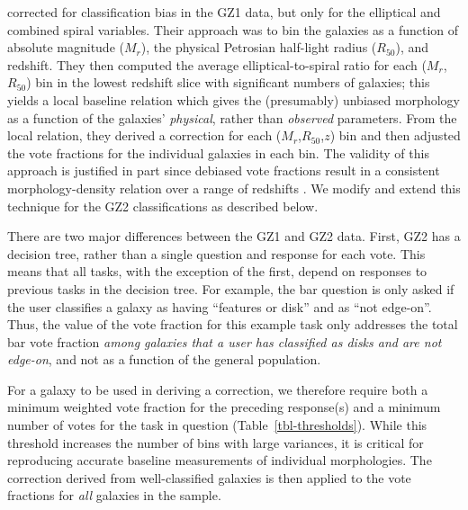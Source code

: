 \documentclass[useAMS,usenatbib]{mn2e}
\newcommand{\mr}{$M_r$}
\newcommand{\rfifty}{$R_{50}$}
\begin{document}
\citet{bam09} corrected for classification bias in the GZ1 data, but only for the elliptical and combined spiral variables. Their approach was to bin the galaxies as a function of absolute magnitude (\mr), the physical Petrosian half-light radius (\rfifty), and redshift. They then computed the average elliptical-to-spiral ratio for each (\mr,\rfifty) bin in the lowest redshift slice with significant numbers of galaxies; this yields a local baseline relation which gives the (presumably) unbiased morphology as a function of the galaxies' {\em physical}, rather than {\em observed} parameters. From the local relation, they derived a correction for each (\mr,\rfifty,$z$) bin and then adjusted the vote fractions for the individual galaxies in each bin. The validity of this approach is justified in part since debiased vote fractions result in a consistent morphology-density relation over a range of redshifts \citep{bam09}. We modify and extend this technique for the GZ2 classifications as described below. 

There are two major differences between the GZ1 and GZ2 data. First, GZ2 has a decision tree, rather than a single question and response for each vote. This means that all tasks, with the exception of the first, depend on responses to previous tasks in the decision tree. For example, the bar question is only asked if the user classifies a galaxy as having ``features or disk'' and as ``not edge-on''. Thus, the value of the vote fraction for this example task only addresses the total bar vote fraction {\em among galaxies that a user has classified as disks and are not edge-on}, and not as a function of the general population. 

For a galaxy to be used in deriving a correction, we therefore require both a minimum weighted vote fraction for the preceding response(s) and a minimum number of votes for the task in question (Table~\ref{tbl-thresholds}). While this threshold increases the number of bins with large variances, it is critical for reproducing accurate baseline measurements of individual morphologies. The correction derived from well-classified galaxies is then applied to the vote fractions for {\em all} galaxies in the sample. 
\end{document}
